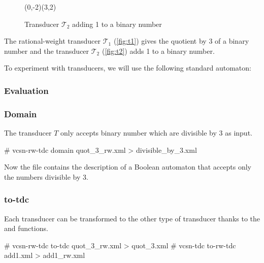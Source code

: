 \begin{figure}[tp]
  \begin{center}
    \begin{VCPicture}{(0,-2)(3,2)}
       
    \end{VCPicture}
    \caption{Transducer $\mathcal{T}_2$ adding 1 to a binary number}
    \label{fig:t2}
  \end{center}
\end{figure}

The rational-weight transducer
$\mathcal{T}_1$ (\autoref{fig:t1}) gives the
quotient by 3 of a binary number and the transducer
$\mathcal{T}_2$ (\autoref{fig:t2}) adds 1 to
a binary number.

\bigskip

To experiment with transducers, we will use the following standard
automaton:
\begin{center}
\end{center}


\subsubsection{Evaluation}


\subsubsection{Domain}
The transducer $T$ only accepts binary number which are divisible by 3
as input.
\begin{shell}
# vcsn-rw-tdc domain quot_3_rw.xml > divisible_by_3.xml
\end{shell}
Now the file  contains the description of a
Boolean automaton that accepts only the numbers divisible by 3.

\subsubsection{to-tdc}
Each transducer can be transformed to the other type of transducer
thanks to the  and  functions.
\begin{shell}
# vcsn-rw-tdc to-tdc quot_3_rw.xml > quot_3.xml
# vcsn-tdc to-rw-tdc add1.xml > add1_rw.xml
\end{shell}

